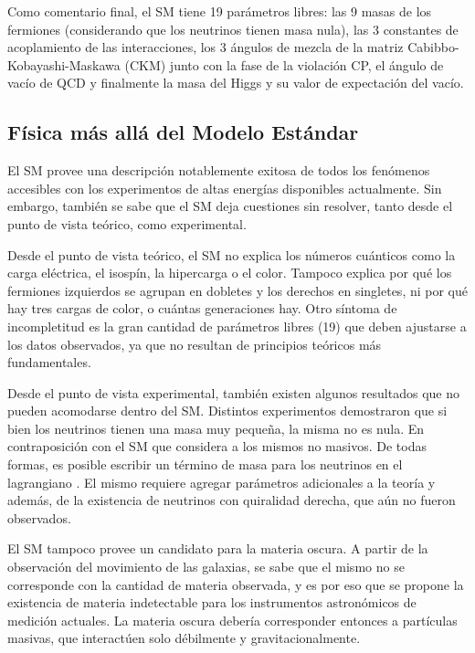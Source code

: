 Como comentario final, el SM tiene 19 parámetros libres: las 9 masas de los fermiones (considerando que los neutrinos tienen masa nula), las 3 constantes de acoplamiento de las interacciones, los 3 ángulos de mezcla de la matriz Cabibbo-Kobayashi-Maskawa (CKM) junto con la fase de la violación CP, el ángulo de vacío de QCD y finalmente la masa del Higgs y su valor de expectación del vacío.


\subsection{Física más allá del Modelo Estándar}

El SM provee una descripción notablemente exitosa de todos los fenómenos accesibles con los experimentos de altas energías disponibles actualmente. Sin embargo, también se sabe que el SM deja cuestiones sin resolver, tanto desde el punto de vista teórico, como experimental.

Desde el punto de vista teórico, el SM no explica los números cuánticos como la carga eléctrica, el isospín, la hipercarga o el color. Tampoco explica por qué los fermiones izquierdos se agrupan en dobletes y los derechos en singletes, ni por qué hay tres cargas de color, o cuántas generaciones hay. Otro síntoma de incompletitud es la gran cantidad de parámetros libres (19) que deben ajustarse a los datos observados, ya que no resultan de principios teóricos más fundamentales.

Desde el punto de vista experimental, también existen algunos resultados que no pueden acomodarse dentro del SM. Distintos experimentos demostraron que si bien los neutrinos tienen una masa muy pequeña, la misma no es nula. En contraposición con el SM que considera a los mismos no masivos. De todas formas, es posible escribir un término de masa para los neutrinos en el lagrangiano \cite{Drewes:2013gca}. El mismo requiere agregar parámetros adicionales a la teoría y además, de la existencia de neutrinos con quiralidad derecha, que aún no fueron observados.

El SM tampoco provee un candidato para la materia oscura. A partir de la observación del movimiento de las galaxias, se sabe que el mismo no se corresponde con la cantidad de materia observada, y es por eso que se propone la existencia de materia indetectable para los instrumentos astronómicos de medición actuales. La materia oscura debería corresponder entonces a partículas masivas, que interactúen solo débilmente y gravitacionalmente.

